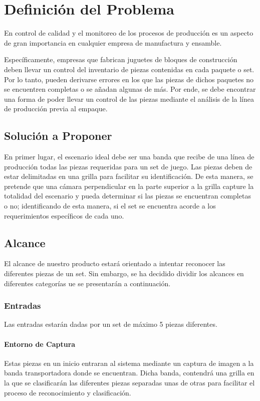 \documentclass[letterpaper]{scrreprt}
\begin{document}
\chapter{Definición del Problema} 
En control de calidad y el monitoreo de los procesos de producción es un aspecto de gran importancia en cualquier empresa de manufactura y ensamble.

Específicamente, empresas que fabrican juguetes de bloques de construcción deben llevar un control del inventario de piezas contenidas en cada paquete o set. Por lo tanto, pueden derivarse errores en los que las piezas de dichos paquetes no se encuentren completas o se añadan algunas de más.  Por ende, se debe encontrar una forma de poder llevar un control de las piezas mediante el análisis de la línea de producción previa al empaque. 

\section{Solución a Proponer}

En primer lugar, el escenario ideal debe ser una banda que recibe de una línea de producción todas las piezas requeridas para un set de juego. Las piezas deben de estar delimitadas en una grilla para facilitar su identificación. De esta manera, se pretende que una cámara perpendicular en la parte superior a la grilla capture la totalidad del escenario y pueda determinar si las piezas se encuentran completas o no; identificando de esta manera, si el set se encuentra acorde a los requerimientos específicos de cada uno.

\section{Alcance}
El alcance de nuestro producto estará orientado a intentar reconocer las diferentes piezas de un set. Sin embargo, se ha decidido dividir los alcances en diferentes categorías ue se presentarán a continuación.

\subsection{Entradas}
Las entradas estarán dadas por un set de máximo 5 piezas diferentes. 
\subsubsection{Entorno de Captura}
Estas piezas en un inicio entraran al sistema mediante un captura de imagen a la banda transportadora donde se encuentran. Dicha banda, contendrá una grilla en la que se clasificarán las diferentes piezas separadas unas de otras para facilitar el proceso de reconocimiento y clasificación.
\end{document}
